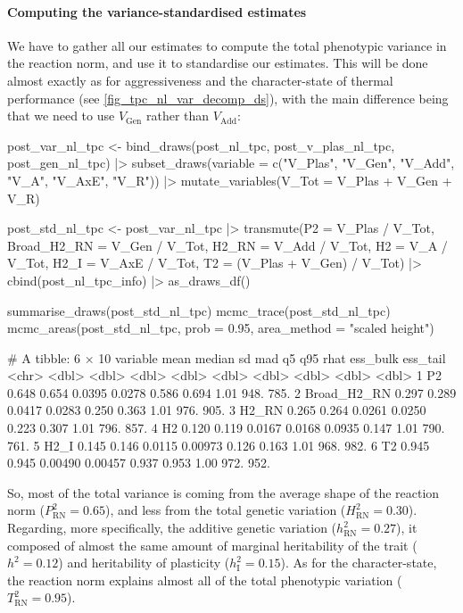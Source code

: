 \documentclass[a4paper,12pt,twoside]{article}
\begin{document}
\paragraph{Computing the variance-standardised estimates}
We have to gather all our estimates to compute the total phenotypic variance in the reaction norm, and use it to standardise our estimates.
This will be done almost exactly as for aggressiveness and the character-state of thermal performance (see \autoref{fig_tpc_nl_var_decomp_ds}), with the main difference being that we need to use $V_{\text{Gen}}$ rather than $V_{\text{Add}}$:
\begin{Rinput}
post_var_nl_tpc <-
    bind_draws(post_nl_tpc, post_v_plas_nl_tpc, post_gen_nl_tpc) |>
    subset_draws(variable = c("V_Plas", "V_Gen", "V_Add", "V_A", "V_AxE", "V_R")) |>
    mutate_variables(V_Tot = V_Plas + V_Gen + V_R)

post_std_nl_tpc <-
    post_var_nl_tpc |>
    transmute(P2            = V_Plas / V_Tot,
              Broad_H2_RN   = V_Gen / V_Tot,
              H2_RN         = V_Add / V_Tot,
              H2            = V_A / V_Tot,
              H2_I          = V_AxE / V_Tot,
              T2            = (V_Plas + V_Gen) / V_Tot) |>
    cbind(post_nl_tpc_info) |>
    as_draws_df()
    
summarise_draws(post_std_nl_tpc)
mcmc_trace(post_std_nl_tpc)
mcmc_areas(post_std_nl_tpc,
           prob = 0.95,
           area_method = "scaled height")
\end{Rinput}
\begin{Routput}
# A tibble: 6 × 10
  variable     mean median      sd     mad     q5   q95  rhat ess_bulk ess_tail
  <chr>       <dbl>  <dbl>   <dbl>   <dbl>  <dbl> <dbl> <dbl>    <dbl>    <dbl>
1 P2          0.648  0.654 0.0395  0.0278  0.586  0.694  1.01     948.     785.
2 Broad_H2_RN 0.297  0.289 0.0417  0.0283  0.250  0.363  1.01     976.     905.
3 H2_RN       0.265  0.264 0.0261  0.0250  0.223  0.307  1.01     796.     857.
4 H2          0.120  0.119 0.0167  0.0168  0.0935 0.147  1.01     790.     761.
5 H2_I        0.145  0.146 0.0115  0.00973 0.126  0.163  1.01     968.     982.
6 T2          0.945  0.945 0.00490 0.00457 0.937  0.953  1.00     972.     952.
\end{Routput}
So, most of the total variance is coming from the average shape of the reaction norm ($P^{2}_{\text{RN}} = 0.65$), and less from the total genetic variation ($H^{2}_{\text{RN}} = 0.30$).
Regarding, more specifically, the additive genetic variation ($h^{2}_{\text{RN}} = 0.27$), it composed of almost the same amount of marginal heritability of the trait ($h^{2}=0.12$) and heritability of plasticity ($h^{2}_{\text{I}} = 0.15$).
As for the character-state, the reaction norm explains almost all of the total phenotypic variation ($T^{2}_{\text{RN}}=0.95$).
\end{document}
